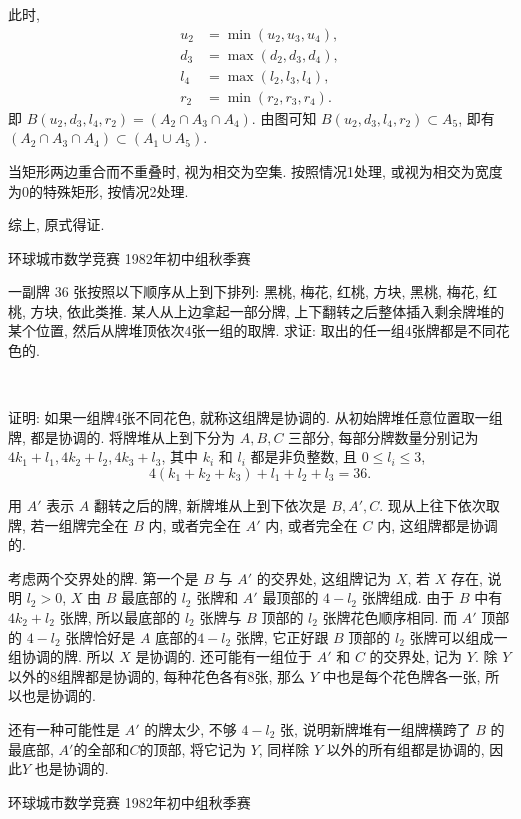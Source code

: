 \noindent 此时, 
\begin{align*}
u_2 &= \min(u_2, u_3, u_4), \\
d_3 &= \max(d_2, d_3, d_4), \\
l_4 &= \max(l_2, l_3, l_4), \\
r_2 &= \min(r_2, r_3, r_4).
\end{align*}
即 $B(u_2, d_3, l_4, r_2) = (A_2\cap A_3\cap A_4)$. 由图可知 $B(u_2, d_3, l_4, r_2)\subset A_5$, 即有 $(A_2\cap A_3\cap A_4) \subset (A_1\cup A_5)$.

当矩形两边重合而不重叠时, 视为相交为空集. 按照情况1处理, 或视为相交为宽度为0的特殊矩形, 按情况2处理.

综上, 原式得证.


\newpage

\noindent 环球城市数学竞赛 1982年初中组秋季赛

一副牌 36 张按照以下顺序从上到下排列: 黑桃, 梅花, 红桃, 方块, 黑桃, 梅花, 红桃, 方块, 依此类推. 某人从上边拿起一部分牌, 上下翻转之后整体插入剩余牌堆的某个位置, 然后从牌堆顶依次4张一组的取牌. 求证: 取出的任一组4张牌都是不同花色的.

~

证明: 如果一组牌4张不同花色, 就称这组牌是协调的. 从初始牌堆任意位置取一组牌, 都是协调的. 将牌堆从上到下分为 $A,B,C$ 三部分, 每部分牌数量分别记为 $4k_1+l_1, 4k_2+l_2, 4k_3+l_3$, 其中 $k_i$ 和 $l_i$ 都是非负整数, 且 $0\le l_i \le 3$, 
\[4(k_1+k_2+k_3) + l_1+l_2+l_3 = 36 .\]

用 $A'$ 表示 $A$ 翻转之后的牌, 新牌堆从上到下依次是 $B, A', C$. 现从上往下依次取牌, 若一组牌完全在 $B$ 内, 或者完全在 $A'$ 内, 或者完全在 $C$ 内, 这组牌都是协调的. 

考虑两个交界处的牌. 第一个是 $B$ 与 $A'$ 的交界处, 这组牌记为 $X$, 若 $X$ 存在, 说明 $l_2 > 0$, $X$ 由 $B$ 最底部的 $l_2$ 张牌和 $A'$ 最顶部的 $4-l_2$ 张牌组成. 由于 $B$ 中有 $4k_2+l_2$ 张牌, 所以最底部的 $l_2$ 张牌与 $B$ 顶部的 $l_2$ 张牌花色顺序相同. 而 $A'$ 顶部的 $4-l_2$ 张牌恰好是 $A$ 底部的$4-l_2$ 张牌, 它正好跟 $B$ 顶部的 $l_2$ 张牌可以组成一组协调的牌. 所以 $X$ 是协调的. 还可能有一组位于 $A'$ 和 $C$ 的交界处, 记为 $Y$. 除 $Y$ 以外的8组牌都是协调的, 每种花色各有8张, 那么 $Y$ 中也是每个花色牌各一张, 所以也是协调的.

还有一种可能性是 $A'$ 的牌太少, 不够 $4-l_2$ 张, 说明新牌堆有一组牌横跨了 $B$ 的最底部, $A'$的全部和$C$的顶部, 将它记为 $Y$, 同样除 $Y$ 以外的所有组都是协调的, 因此$Y$ 也是协调的.


\newpage
\noindent 环球城市数学竞赛 1982年初中组秋季赛

